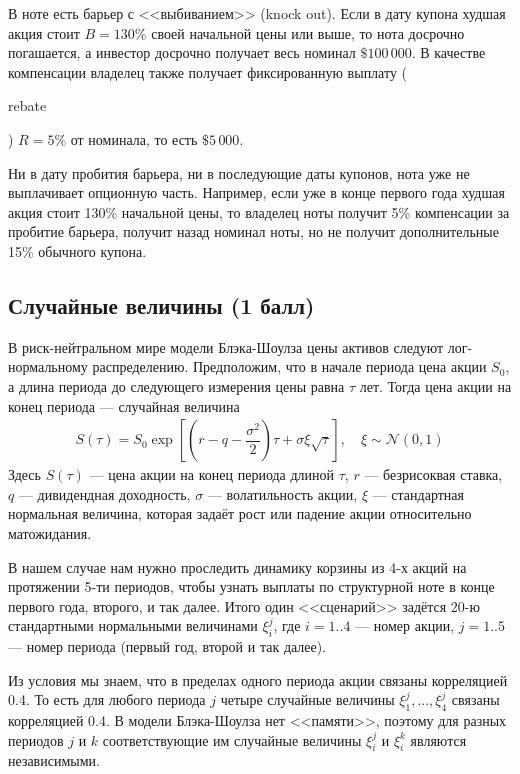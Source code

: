 \documentclass[a4paper,14pt]{extarticle}
\newcommand{\en}[1]{\begin{otherlanguage}{english}#1\end{otherlanguage}}
\begin{document}
В ноте есть барьер с <<выбиванием>> (knock out). Если в дату купона худшая акция стоит $B=130\%$ своей начальной цены или выше, то нота досрочно погашается, а инвестор досрочно получает весь номинал $\$100\,000$. В качестве компенсации владелец также получает фиксированную выплату (\en{rebate}) $R=5\%$ от номинала, то есть $\$5\,000$.

Ни в дату пробития барьера, ни в последующие даты купонов, нота уже не выплачивает опционную часть. Например, если уже в конце первого года худшая акция стоит 130\% начальной цены, то владелец ноты получит 5\% компенсации за пробитие барьера, получит назад номинал ноты, но не получит дополнительные 15\% обычного купона.

\subsection{Случайные величины (1 балл)}

В риск-нейтральном мире модели Блэка-Шоулза цены активов следуют лог-нормальному
распределению. Предположим, что в начале периода цена акции $S_0$, а длина
периода до следующего измерения цены равна $\tau$ лет. Тогда цена акции на 
конец периода --- случайная величина
\begin{align}
S(\tau) = S_0\exp\left[\left(r - q - \dfrac{\sigma^2}{2}\right)\tau +
\sigma\xi\sqrt{\tau}\right], \quad \xi \sim \mathcal{N}(0, 1)
\label{brownian_final_price}
\end{align}
Здесь $S(\tau)$ --- цена акции на конец периода длиной $\tau$, $r$ ---
безрисоквая ставка, $q$ --- дивидендная доходность, $\sigma$ --- волатильность акции, $\xi$ --- стандартная 
нормальная величина, которая задаёт рост или падение акции относительно 
матожидания.

В нашем случае нам нужно проследить динамику корзины из 4-х акций на 
протяжении 5-ти периодов, чтобы узнать выплаты по структурной ноте в конце 
первого года, второго, и так далее. Итого один <<сценарий>> задётся 20-ю 
стандартными нормальными величинами $\xi_i^j$, где $i=1..4$ --- номер акции, 
$j=1..5$ --- номер периода (первый год, второй и так далее).

Из условия мы знаем, что в пределах одного периода акции связаны корреляцией
0.4. То есть для любого периода $j$ четыре случайные величины $\xi_1^j,...,
\xi_4^j$ связаны корреляцией 0.4. В модели Блэка-Шоулза нет <<памяти>>, поэтому
для разных периодов $j$ и $k$ соответствующие им случайные величины $\xi_i^j$ и
$\xi_i^k$ являются независимыми.
\end{document}
